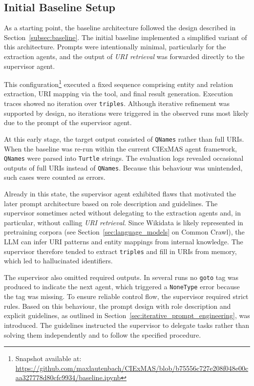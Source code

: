 \documentclass[a4paper,oneside,bibliography=totoc]{scrbook}
\begin{document}
\subsection{Initial Baseline Setup}
\label{subsec:initial_baseline_setup}

As a starting point, the baseline architecture followed the design described in Section~\ref{subsec:baseline}. The initial baseline implemented a simplified variant of this architecture. Prompts were intentionally minimal, particularly for the extraction agents, and the output of \textit{URI retrieval} was forwarded directly to the supervisor agent.

This configuration\footnote{Snapshot available at: \url{https://github.com/maxlautenbach/CIExMAS/blob/b75556c727e208f048e00caa327778d80cfc9934/baseline.ipynb}} executed a fixed sequence comprising entity and relation extraction, URI mapping via the tool, and final result generation. Execution traces showed no iteration over \texttt{triples}. Although iterative refinement was supported by design, no iterations were triggered in the observed runs most likely due to the prompt of the supervisor agent.

At this early stage, the target output consisted of \texttt{QNames} rather than full URIs. When the baseline was re-run within the current CIExMAS agent framework, \texttt{QNames} were parsed into \texttt{Turtle} strings. The evaluation logs revealed occasional outputs of full URIs instead of \texttt{QNames}. Because this behaviour was unintended, such cases were counted as errors.

Already in this state, the supervisor agent exhibited flaws that motivated the later prompt architecture based on role description and guidelines. The supervisor sometimes acted without delegating to the extraction agents and, in particular, without calling \textit{URI retrieval}. Since Wikidata is likely represented in pretraining corpora (see Section~\ref{sec:language_models} on Common Crawl), the \ac{LLM} can infer URI patterns and entity mappings from internal knowledge. The supervisor therefore tended to extract \texttt{triples} and fill in URIs from memory, which led to hallucinated identifiers.

The supervisor also omitted required outputs. In several runs no \texttt{goto} tag was produced to indicate the next agent, which triggered a \texttt{NoneType} error because the tag was missing. To ensure reliable control flow, the supervisor required strict rules. Based on this behaviour, the prompt design with role description and explicit guidelines, as outlined in Section~\ref{sec:iterative_prompt_engineering}, was introduced. The guidelines instructed the supervisor to delegate tasks rather than solving them independently and to follow the specified procedure.
\end{document}
